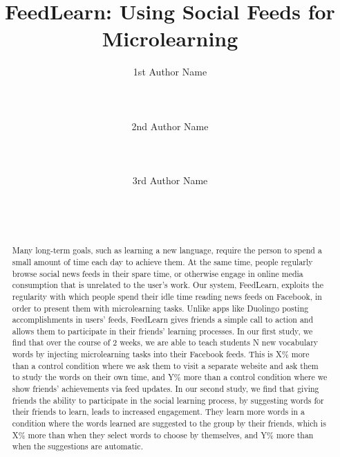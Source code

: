 \documentclass{sigchi}
\begin{document}
\title{FeedLearn: Using Social Feeds for Microlearning}

\author{
  \alignauthor 1st Author Name\\
    \\
    \\
    \\
  \alignauthor 2nd Author Name\\
    \\
    \\
    \\
  \alignauthor 3rd Author Name\\
    \\
    \\
    \\
}

\maketitle

\begin{abstract}
Many long-term goals, such as learning a new language,
require the person to spend a small amount of time each day to achieve them.
At the same time, people regularly browse social news feeds in their spare time, or otherwise
engage in online media consumption that is unrelated to the user's work.
Our system, FeedLearn, exploits the regularity with which people spend their idle time reading news feeds on Facebook,
in order to present them with microlearning tasks. Unlike apps like Duolingo posting accomplishments in users' feeds, FeedLearn gives friends a simple call to action and allows them to participate in their friends' learning processes.
In our first study, we find that over the course of 2 weeks, we are able to teach students N new vocabulary words by injecting microlearning tasks into their Facebook feeds. This is X\% more than a control condition where we ask them to visit a separate website and ask them to study the words on their own time, and Y\% more than a control condition where we show friends' achievements via feed updates. In our second study, we find that giving friends the ability to participate in the social learning process, by suggesting words for their friends to learn, leads to increased engagement. They learn more words in a condition where the words learned are suggested to the group by their friends, which is X\% more than when they select words to choose by themselves, and Y\% more than when the suggestions are automatic.

\end{abstract}
\end{document}
